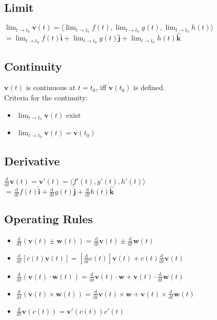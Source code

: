 \documentclass[UTF8,a4paper, 10pt, openany]{svmono}
\begin{document}
\subsection{Limit}
\begin{center}
$\displaystyle	\lim_{t \to t_0} \mathbf{v}(t) = \langle\displaystyle\lim_{t \to t_0}f(t),\displaystyle\lim_{t \to t_0}g(t),\displaystyle\lim_{t \to t_0}h(t)	\rangle$\\
$=\displaystyle\lim_{t \to t_0}f(t)\mathbf{\hat{i}}+\displaystyle\lim_{t \to t_0}g(t)\mathbf{\hat{j}}+\displaystyle\lim_{t \to t_0}h(t)\mathbf{\hat{k}}$
\end{center}
\subsection{Continuity}
$\mathbf{v}(t)$ is continuous at $t=t_0$, iff $\mathbf{v}(t_0)$ is defined.\\
Criteria for the continuity:
\begin{itemize}
\item $\displaystyle\lim_{t \to t_0} \mathbf{v}(t)$ exist
\item $\displaystyle\lim_{t \to t_0} \mathbf{v}(t)=\mathbf{v}(t_0)$
\end{itemize}
\subsection{Derivative}
\begin{center}
$\frac{\mathrm d}{\mathrm d t}\mathbf{v}(t)=\mathbf{v}'(t)=\langle f'(t),g'(t),h'(t) \rangle$\\
$=\frac{\mathrm d}{\mathrm d t}f(t)\mathbf{\hat{i}}+\frac{\mathrm d}{\mathrm d t}g(t)\mathbf{\hat{j}}+\frac{\mathrm d}{\mathrm d t}h(t)\mathbf{\hat{k}}$
\end{center}
\subsection{Operating Rules}
\begin{itemize}
\item $\frac{\mathrm d}{\mathrm d t}(\mathbf{v}(t)\pm \mathbf{w}(t))=\frac{\mathrm d}{\mathrm d t}\mathbf{v}(t)\pm \frac{\mathrm d}{\mathrm d t}\mathbf{w}(t)$
\item $\frac{\mathrm d}{\mathrm d t}[c(t)\mathbf{v}(t)]=[\frac{\mathrm d}{\mathrm d t}c(t)]\mathbf{v}(t)+c(t)\frac{\mathrm d}{\mathrm d t}\mathbf{v}(t)$
\item $\frac{\mathrm d}{\mathrm d t}(\mathbf{v}(t)\cdot \mathbf{w}(t))=\frac{\mathrm d}{\mathrm d t}\mathbf{v}(t)\cdot \mathbf{w}+\mathbf{v}(t)\cdot \frac{\mathrm d}{\mathrm d t}\mathbf{w}(t)$
\item $\frac{\mathrm d}{\mathrm d t}(\mathbf{v}(t)\times \mathbf{w}(t))=\frac{\mathrm d}{\mathrm d t}\mathbf{v}(t)\times \mathbf{w}+\mathbf{v}(t)\times \frac{\mathrm d}{\mathrm d t}\mathbf{w}(t)$
\item $\frac{\mathrm d}{\mathrm d t}\mathbf{v}(c(t))=\mathbf{v}'(c(t))c'(t)$
\end{itemize}
\end{document}
